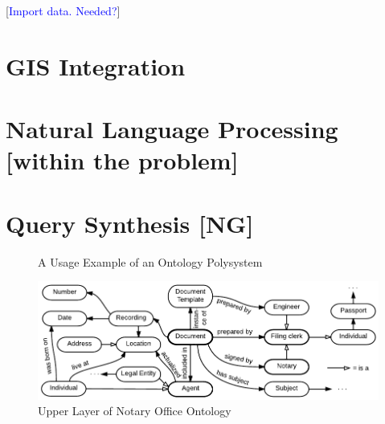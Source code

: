 \documentclass[conference]{IEEEtran}
\newcommand{\e}[2][fcolor]{\textcolor{pcolor}{[}\textcolor{#1}{#2}\textcolor{pcolor}{]}}
\begin{document}
\e[blue]{Import data. Needed?}





\section{GIS Integration}
\label{sec:gis-integration}



\section{Natural Language Processing [within the problem]}
\label{sec:natur-lang-proc}

\section{Query Synthesis [NG]}
\label{sec:query-synthesis-ng}


\begin{figure}
\centering\footnotesize\sf
\def\svgwidth{0.9\linewidth}

\caption{A Usage Example of an Ontology Polysystem}
\label{OPSA}
\end{figure}

\begin{figure}[!t]
\centering
\includegraphics[width=\linewidth]{DocumentOntology-en.pdf}
\caption{Upper Layer of Notary Office Ontology}
\label{notaryontology}
\end{figure}
\end{document}
